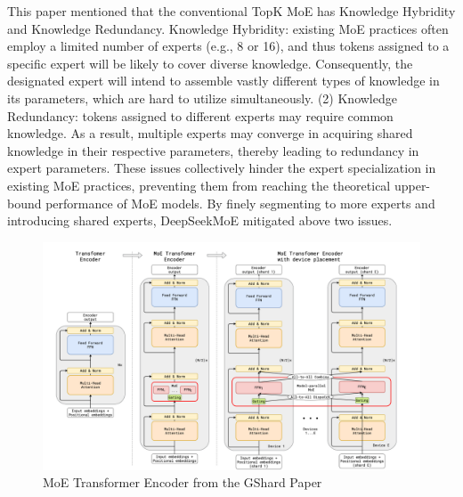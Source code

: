 This paper mentioned that the conventional TopK MoE has Knowledge Hybridity and Knowledge Redundancy. Knowledge Hybridity: existing MoE practices often employ a limited number of experts (e.g., 8 or 16), and thus tokens assigned to a specific expert will be likely to cover diverse knowledge. Consequently, the designated expert will intend to assemble vastly different types of knowledge in its parameters, which are hard to utilize simultaneously. (2) Knowledge Redundancy: tokens assigned to different experts may require common knowledge. As a result, multiple experts may converge in acquiring shared knowledge in their respective parameters, thereby leading to redundancy in expert parameters. These issues collectively hinder the expert specialization in existing MoE practices, preventing them from reaching the theoretical upper-bound performance of MoE models. By finely segmenting to more experts and introducing shared experts, DeepSeekMoE mitigated above two issues.

\begin{figure}[t]
	\centering
	\includegraphics[scale=0.35]{./images/transformer/moe_block.png}
	\caption{MoE Transformer Encoder from the GShard Paper}
\end{figure}

